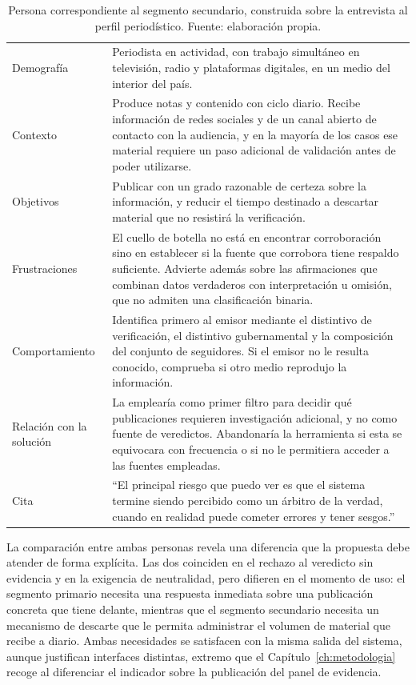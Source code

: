 \begin{table}[t]
  \centering
  \caption{Persona correspondiente al segmento secundario, construida sobre la entrevista al perfil periodístico. Fuente: elaboración propia.}
  \label{tab:persona-2}
  \begin{tabular}{>{\raggedright\arraybackslash}p{3.3cm}p{10.2cm}}
    \hline
    \multicolumn{2}{l}{\textbf{Persona 2: Valeria, periodista de medios regionales}} \\
    \hline
    Demografía & Periodista en actividad, con trabajo simultáneo en televisión, radio y plataformas digitales, en un medio del interior del país. \\
    Contexto & Produce notas y contenido con ciclo diario. Recibe información de redes sociales y de un canal abierto de contacto con la audiencia, y en la mayoría de los casos ese material requiere un paso adicional de validación antes de poder utilizarse. \\
    Objetivos & Publicar con un grado razonable de certeza sobre la información, y reducir el tiempo destinado a descartar material que no resistirá la verificación. \\
    Frustraciones & El cuello de botella no está en encontrar corroboración sino en establecer si la fuente que corrobora tiene respaldo suficiente. Advierte además sobre las afirmaciones que combinan datos verdaderos con interpretación u omisión, que no admiten una clasificación binaria. \\
    Comportamiento & Identifica primero al emisor mediante el distintivo de verificación, el distintivo gubernamental y la composición del conjunto de seguidores. Si el emisor no le resulta conocido, comprueba si otro medio reprodujo la información. \\
    Relación con la solución & La emplearía como primer filtro para decidir qué publicaciones requieren investigación adicional, y no como fuente de veredictos. Abandonaría la herramienta si esta se equivocara con frecuencia o si no le permitiera acceder a las fuentes empleadas. \\
    Cita & \enquote{El principal riesgo que puedo ver es que el sistema termine siendo percibido como un árbitro de la verdad, cuando en realidad puede cometer errores y tener sesgos.} \\
    \hline
  \end{tabular}
\end{table}

La comparación entre ambas personas revela una diferencia que la propuesta debe atender de forma explícita. Las dos coinciden en el rechazo al veredicto sin evidencia y en la exigencia de neutralidad, pero difieren en el momento de uso: el segmento primario necesita una respuesta inmediata sobre una publicación concreta que tiene delante, mientras que el segmento secundario necesita un mecanismo de descarte que le permita administrar el volumen de material que recibe a diario. Ambas necesidades se satisfacen con la misma salida del sistema, aunque justifican interfaces distintas, extremo que el Capítulo~\ref{ch:metodologia} recoge al diferenciar el indicador sobre la publicación del panel de evidencia.

